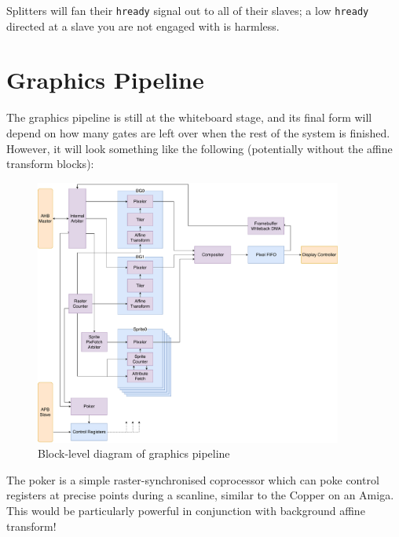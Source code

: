 \documentclass[notitlepage]{article}
\begin{document}
Splitters will fan their \texttt{hready} signal out to all of their slaves; a low \texttt{hready} directed at a slave you are not engaged with is harmless.


\section{Graphics Pipeline}

The graphics pipeline is still at the whiteboard stage, and its final form will depend on how many gates are left over when the rest of the system is finished. However, it will look something like the following (potentially without the affine transform blocks):

\begin{figure}[!htb]
\centering
\caption{Block-level diagram of graphics pipeline}
\includegraphics[width=0.9\textwidth]{diagrams/graphics.pdf}
\end{figure}

The poker is a simple raster-synchronised coprocessor which can poke control registers at precise points during a scanline, similar to the Copper on an Amiga. This would be particularly powerful in conjunction with background affine transform!
\end{document}
